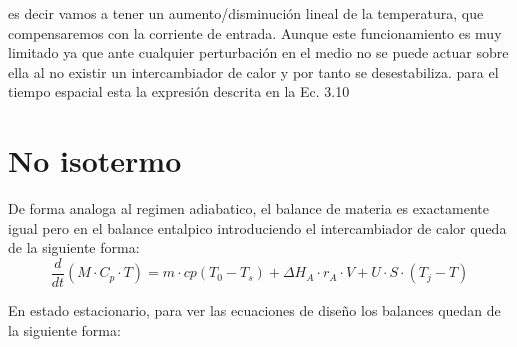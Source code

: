 es decir vamos a tener un aumento/disminución lineal de la temperatura, que compensaremos con la corriente de entrada. Aunque este funcionamiento es muy limitado ya que ante cualquier perturbación en el medio no se puede actuar sobre ella al no existir un intercambiador de calor y por tanto se desestabiliza.
para el tiempo espacial esta la expresión descrita en la Ec. 3.10
\section{No isotermo}
\noindent De forma analoga al regimen adiabatico, el balance de materia es exactamente igual pero en el balance entalpico introduciendo el intercambiador de calor queda de la siguiente forma:
\begin{equation}
	\frac{d}{dt}  (M\cdot C_p \cdot T) = m \cdot cp (T_0 - T_s) + \Delta H_A \cdot r_A \cdot V +  U \cdot S \cdot (T_{j}-T)
\end{equation}

En estado estacionario, para ver las ecuaciones de diseño los balances quedan de la siguiente forma:


